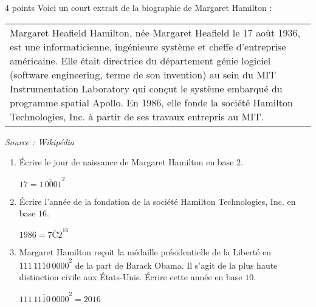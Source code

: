 \documentclass[a4paper,dvipsnames]{article}
\begin{document}
\begin{exercice}{4 points}{}
  Voici un court extrait de la biographie de Margaret Hamilton :

  \begin{center}
    \begin{tabular}{|p{12cm}}
      Margaret Heafield Hamilton, née Margaret Heafield le 17 août 1936, est une informaticienne, ingénieure système et cheffe d'entreprise américaine. Elle était directrice du département génie logiciel (\og{}software engineering\fg{}, terme de son invention) au sein du MIT Instrumentation Laboratory qui conçut le système embarqué du programme spatial Apollo. En 1986, elle fonde la société Hamilton Technologies, Inc. à partir de ses travaux entrepris au MIT.  
    \end{tabular}

    \smallskip

    \begin{minipage}{12cm}
      \flushright\textit{Source : Wikipédia}
    \end{minipage}
  \end{center}

  \begin{enumerate}
    \item Écrire le jour de naissance de Margaret Hamilton en base $2$.

      \begin{correction}
	$17=\overline{1\,0001}^2$
      \end{correction}
      
    \item Écrire l'année de la fondation de la société Hamilton Technologies, Inc. en base $16$.

      \begin{correction}
	$1986=\overline{7\text{C}2}^{16}$
      \end{correction}
      
    \item Margaret Hamilton reçoit la médaille présidentielle de la Liberté en $\overline{111\,1110\,0000}^2$ de la part de Barack Obama. Il s'agit de la plus haute distinction civile aux États-Unis. Écrire cette année en base $10$.

      \begin{correction}
        $\overline{111\,1110\,0000}^2=2016$
      \end{correction}
      

\end{enumerate}
\end{exercice}
\end{document}

